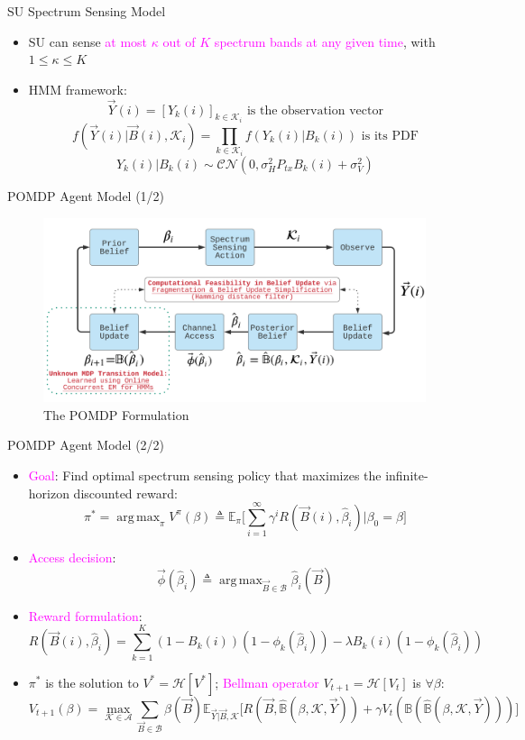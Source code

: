 \documentclass{beamer}
\DeclareMathOperator*{\argmax}{arg\,max}
\begin{document}
\begin{frame}{SU Spectrum Sensing Model}
    \begin{itemize}
        \item SU can sense \textcolor{magenta}{at most $\kappa$ out of $K$ spectrum bands at any given time}, with $1{\leq}\kappa{\leq}K$
        \item HMM framework:
        \[\vec{Y}(i) = [Y_k(i)]_{k {\in} \mathcal K_i}\text{ is the observation vector}\]
        \[f(\vec{Y}(i)|\vec{B}(i), \mathcal K_i) = \prod_{k \in \mathcal K_i} f(Y_k(i)|B_k(i))\text{ is its PDF}\]
        \[Y_k(i)|B_k(i) \sim \mathcal{CN}(0, \sigma_H^2P_{tx}B_k(i) + \sigma_V^2)\]
    \end{itemize}
\end{frame}
\begin{frame}{POMDP Agent Model (1/2)}
   \begin{figure}
    \centering
    \includegraphics[width = 1.0\textwidth]{figs/Minerva_POMDP_Model.png}
    \caption{The POMDP Formulation}
    \label{fig:2c}
\end{figure}
\end{frame}
\begin{frame}{POMDP Agent Model (2/2)}
    \footnotesize{\begin{itemize}
        \item \textcolor{magenta}{Goal}: Find optimal spectrum sensing policy that maximizes the infinite-horizon discounted reward:
        \[\pi^{*}{=}\argmax_{\pi} V^{\pi}(\beta) \triangleq \mathbb{E}_{\pi} \Big[\sum_{i=1}^{\infty} \gamma^{i} R(\vec{B}(i), \hat{\beta}_i)|\beta_0 {=}\beta\Big]\]
        \item \textcolor{magenta}{Access decision}:
        \[\vec{\phi}(\hat{\beta}_{i})\triangleq \argmax_{\vec{B} {\in} \mathcal{B}} \hat{\beta}_{i}(\vec{B})\]
        \item \textcolor{magenta}{Reward formulation}:
        \[R(\vec{B}(i), \hat{\beta}_i){=}\sum_{k=1}^{K} (1{-}B_k(i))(1{-}\phi_k(\hat{\beta}_{i})){-}\lambda B_k(i)(1 - \phi_k(\hat{\beta}_i))\]
        \item $\pi^{*}$ is the solution to $V^*{=}\mathcal{H}[V^*]$; \textcolor{magenta}{Bellman operator} $V_{t+1}{=}\mathcal {H}[V_{t}]$ is ${\forall}\beta:$
        \[V_{t+1}(\beta) = \max_{\mathcal{K} {\in} \mathcal{A}} \sum_{\vec{B} {\in} \mathcal{B}} \beta(\vec{B}) \mathbb{E}_{\vec{Y}|\vec{B}, \mathcal{K}} \Big[R(\vec{B}, \hat{\mathbb{B}}(\beta, \mathcal{K}, \vec{Y}))+\gamma V_{t}(\mathbb{B}(\hat{\mathbb{B}}(\beta, \mathcal{K}, \vec{Y})))\Big]\]
    \end{itemize}}
\end{frame}
\end{document}
